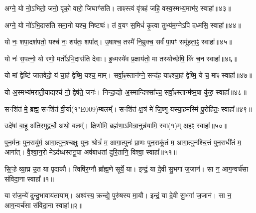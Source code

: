 अग्ने॒ यो नो॒ऽभितो॒ जनो॒ वृको॒ वारो॒ जिघाꣳ॑सति। 
ताꣴस्त्वं वृ॑त्रहं जहि॒ वस्व॒स्मभ्य॒माभ॑र॒ स्वाहा᳚॥४३॥



अग्ने॒ यो नो॑ऽभि॒दास॑ति समा॒नो यश्च॒ निष्ट्यः॑। 
तं व॒यꣳ स॒मिधं॑ कृ॒त्वा तुभ्य॑म॒ग्नेऽपि॑ दध्मसि॒ स्वाहा᳚॥४४॥



यो नः॒ शपा॒दश॑पतो॒ यश्च॑ नः॒ शप॑तः॒ शपा᳚त्। 
उ॒षाश्च॒ तस्मै॑ नि॒म्रुक्च॒ सर्वं॑ पा॒पꣳ समू॑हता॒ꣴ॒ स्वाहा᳚॥४५॥



यो नः॑ स॒पत्नो॒ यो रणो॒ मर्तो॑ऽभि॒दास॑ति देवाः। 
इ॒ध्मस्ये॑व प्र॒क्षाय॑तो॒ मा तस्योच्छे॑षि॒ किं च॒न स्वाहा᳚॥४६॥



यो मां द्वेष्टि॑ जातवेदो॒ यं चा॒हं द्वेष्मि॒ यश्च॒ माम्। 
सर्वा॒ꣴ॒स्तान॑ग्ने॒ सन्द॑ह॒ याꣴश्चा॒हं द्वेष्मि॒ ये च॒ माꣴ स्वाहा᳚॥४७॥



यो अ॒स्मभ्य॑मराती॒याद्यश्च॑ नो॒ द्वेष॑ते॒ जनः॑। 
निन्दा॒द्यो अ॒स्मान्दिफ्सा᳚च्च॒ सर्वा॒ꣴ॒स्तान्म॑ष्म॒षा कु॑रु॒ स्वाहा᳚॥४८॥



सꣳशि॑तं मे॒ ब्रह्म॒ सꣳशि॑तं वी॒र्या(१\char"E009)म्बलम्᳚। 
सꣳशि॑तं क्ष॒त्रं मे॑ जि॒ष्णु यस्या॒हमस्मि॑ पु॒रोहि॑तः॒ स्वाहा᳚॥४९॥



उदे॑षां बा॒हू अ॑तिर॒मुद्वर्चो॒ अथो॒ बलम्᳚। 
क्षि॒णोमि॒ ब्रह्म॑णा॒ऽमित्रा॒नुन्न॑\-यामि॒ स्वा(१)म् अ॒हꣴ स्वाहा᳚॥५०॥



पुन॒र्मनः॒ पुन॒रायु॑र्म॒ आगा॒त्पुन॒श्चक्षुः॒ पुनः॒ श्रोत्रं॑ म॒ आगा॒त्पुनः॑ प्रा॒णः पुन॒राकू॑तं म॒ आगा॒त्पुन॑श्चि॒त्तं पुन॒राधी॑तं म॒ आगा᳚त्। 
वै॒श्वा॒न॒रो मेऽद॑ब्धस्तनू॒पा अव॑बाधतां दुरि॒तानि॒ विश्वा॒ स्वाहा᳚॥५१॥




सि॒ꣳ॒हे व्या॒घ्र उ॒त या पृदा॑कौ।
त्विषि॑र॒ग्नौ ब्रा᳚ह्म॒णे सूर्ये॒ या।
इन्द्रं॒ या दे॒वी सु॒भगा॑ ज॒जान॑।
सा न॒ आग॒न्वर्च॑सा संविदा॒ना स्वाहा᳚॥१॥



या रा॑ज॒न्ये॑ दुन्दु॒भावाय॑तायाम्।
अश्व॑स्य॒ क्रन्द्ये॒ पुरु॑षस्य मा॒यौ।
इन्द्रं॒ या दे॒वी सु॒भगा॑ ज॒जान॑।
सा न॒ आग॒न्वर्च॑सा संविदा॒ना स्वाहा᳚॥२॥


